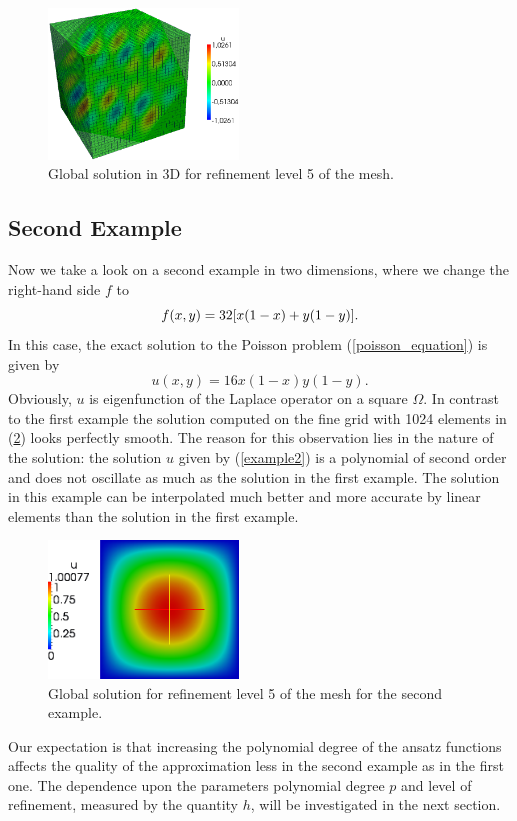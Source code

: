 \documentclass[a4paper, 11pt, twoside]{article}
\begin{document}
\begin{figure}[h!]
	\centering
		\includegraphics[width=0.45\textwidth]{fig/u_poisson_tut_3d_lvl5_M2N4O1_mesh_trans.png}
\caption{Global solution in 3D for refinement level 5 of the mesh.}
\label{3dsol5}
\end{figure}



\newpage

\subsection{Second Example}\label{section:second_example}
Now we take a look on a second example in two dimensions, where we change the right-hand side $f$ to
\begin{equation}
f(x,y) = 32[x(1-x) + y(1-y)]. \notag
\end{equation}
In this case, the exact solution to the Poisson problem (\ref{poisson_equation}) is given by
\begin{equation}
u(x,y) = 16x(1-x)y(1-y).
\label{example2}
\end{equation}
Obviously, $u$ is eigenfunction of the Laplace operator on a square $\Omega$. In contrast to the first example the solution computed on the fine grid with 1024 elements in (\ref{polynom}) looks perfectly smooth. The reason for this observation lies in the nature of the solution: the solution $u$ given by (\ref{example2}) is a polynomial of second order and does not oscillate as much as the solution in the first example. The solution in this example can be interpolated much better and more accurate by linear elements than the solution in the first example. \\
\begin{figure}[htb]
  \centering      
  \includegraphics[width=0.45\textwidth]{fig/polynom_trans.png}
\caption{Global solution for refinement level 5 of the mesh for the second example.}
\label{polynom}
\end{figure}
Our expectation is that increasing the polynomial degree of the ansatz functions affects the quality of the approximation less in the second example as in the first one. The dependence upon the parameters polynomial degree $p$ and level of refinement, measured by the quantity $h$, will be investigated in the next section.
\end{document}
